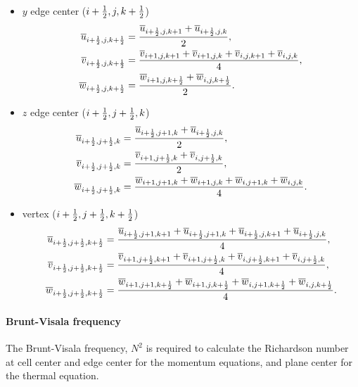 \begin{itemize}
  \item $y$ edge center ($i+\frac{1}{2},j,k+\frac{1}{2}$)
    \begin{align}
      \overline{u}_{i+\frac{1}{2},j,k+\frac{1}{2}} &=
      \frac{\overline{u}_{i+\frac{1}{2},j,k+1}+\overline{u}_{i+\frac{1}{2},j,k}}{2}, \\
      \overline{v}_{i+\frac{1}{2},j,k+\frac{1}{2}} &=
      \frac{\overline{v}_{i+1,j,k+1}+\overline{v}_{i+1,j,k}+\overline{v}_{i,j,k+1}+\overline{v}_{i,j,k}}{4}, \\
      \overline{w}_{i+\frac{1}{2},j,k+\frac{1}{2}} &=
      \frac{\overline{w}_{i+1,j,k+\frac{1}{2}}+\overline{w}_{i,j,k+\frac{1}{2}}}{2}.
    \end{align}

  \item $z$ edge center ($i+\frac{1}{2},j+\frac{1}{2},k$)
    \begin{align}
      \overline{u}_{i+\frac{1}{2},j+\frac{1}{2},k} &=
      \frac{\overline{u}_{i+\frac{1}{2},j+1,k}+\overline{u}_{i+\frac{1}{2},j,k}}{2}, \\
      \overline{v}_{i+\frac{1}{2},j+\frac{1}{2},k} &=
      \frac{\overline{v}_{i+1,j+\frac{1}{2},k}+\overline{v}_{i,j+\frac{1}{2},k}}{2}, \\
      \overline{w}_{i+\frac{1}{2},j+\frac{1}{2},k} &=
      \frac{\overline{w}_{i+1,j+1,k}+\overline{w}_{i+1,j,k}+\overline{w}_{i,j+1,k}+\overline{w}_{i,j,k}}{4}.
    \end{align}

  \item vertex ($i+\frac{1}{2},j+\frac{1}{2},k+\frac{1}{2}$)
    \begin{align}
      \overline{u}_{i+\frac{1}{2},j+\frac{1}{2},k+\frac{1}{2}} &=
      \frac{\overline{u}_{i+\frac{1}{2},j+1,k+1}+\overline{u}_{i+\frac{1}{2},j+1,k}+\overline{u}_{i+\frac{1}{2},j,k+1}+\overline{u}_{i+\frac{1}{2},j,k}}{4}, \\
      \overline{v}_{i+\frac{1}{2},j+\frac{1}{2},k+\frac{1}{2}} &=
      \frac{\overline{v}_{i+1,j+\frac{1}{2},k+1}+\overline{v}_{i+1,j+\frac{1}{2},k}+\overline{v}_{i,j+\frac{1}{2},k+1}+\overline{v}_{i,j+\frac{1}{2},k}}{4}, \\
      \overline{w}_{i+\frac{1}{2},j+\frac{1}{2},k+\frac{1}{2}} &=
      \frac{\overline{w}_{i+1,j+1,k+\frac{1}{2}}+\overline{w}_{i+1,j,k+\frac{1}{2}}+\overline{w}_{i,j+1,k+\frac{1}{2}}+\overline{w}_{i,j,k+\frac{1}{2}}}{4}.
    \end{align}
\end{itemize}


\paragraph{Brunt-Visala frequency}
The Brunt-Visala frequency, $N^2$ is required to calculate the Richardson number
at cell center and edge center for the momentum equations,
and plane center for the thermal equation.

